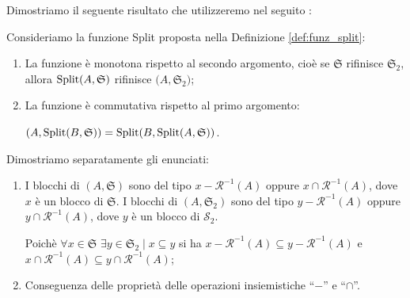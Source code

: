 Dimostriamo il seguente risultato che utilizzeremo nel seguito \cite{dovier}:
\begin{theorem}
    \label{theo:split_properties}
    Consideriamo la funzione Split proposta nella Definizione \ref{def:funz_split}:
    \begin{enumerate}
        \item La funzione è monotona rispetto al secondo argomento, cioè se $\mathfrak{S}$ rifinisce $\mathfrak{S}_2$, allora $\textup{Split}(A,\mathfrak{S})$ rifinisce $\mathfrak(A,\mathfrak{S}_2)$;
        \item La funzione è commutativa rispetto al primo argomento:

        \splitfunc$(A,\textup{Split}(B,\mathfrak{S})) = \textup{Split}(B, \textup{Split}(A,\mathfrak{S}))$.
    \end{enumerate}
\end{theorem}
\begin{proof2}
    Dimostriamo separatamente gli enunciati:
    \begin{enumerate}
        \item I blocchi di \splitfunc$(A,\mathfrak{S})$ sono del tipo $x - \mathcal{R}^{-1}(A)$ oppure $x \cap \mathcal{R}^{-1}(A)$, dove $x$ è un blocco di $\mathfrak{S}$. I blocchi di \splitfunc$(A,\mathfrak{S}_2)$ sono del tipo $y - \mathcal{R}^{-1}(A)$ oppure $y \cap \mathcal{R}^{-1}(A)$, dove $y$ è un blocco di $\mathcal{S}_2$.

        Poichè $\forall x \in \mathfrak{S} \,\,\exists y \in \mathfrak{S}_2 \mid x \subseteq y$ si ha $x - \mathcal{R}^{-1}(A) \subseteq y - \mathcal{R}^{-1}(A)$ e $x \cap \mathcal{R}^{-1}(A) \subseteq y \cap \mathcal{R}^{-1}(A)$;
        \item Conseguenza delle proprietà delle operazioni insiemistiche ``$-$'' e ``$\cap$''.
    \end{enumerate}
\end{proof2}
